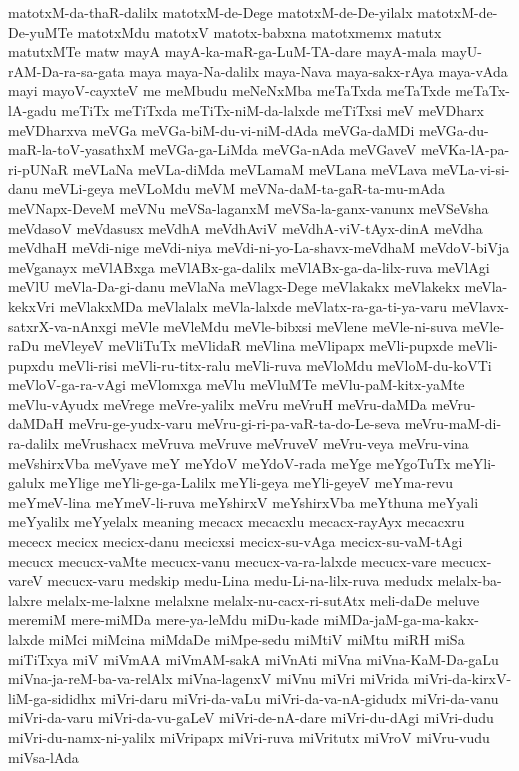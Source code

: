 {matotxM-da-thaR-dalilx
matotxM-de-Dege
matotxM-de-De-yilalx
matotxM-de-De-yuMTe
matotxMdu
matotxV
matotx-babxna
matotxmemx
matutx
matutxMTe
matw
mayA
mayA-ka-maR-ga-LuM-TA-dare
mayA-mala
mayU-rAM-Da-ra-sa-gata
maya
maya-Na-dalilx
maya-Nava
maya-sakx-rAya
maya-vAda
mayi
mayoV-cayxteV
me
meMbudu
meNeNxMba
meTaTxda
meTaTxde
meTaTx-lA-gadu
meTiTx
meTiTxda
meTiTx-niM-da-lalxde
meTiTxsi
meV
meVDharx
meVDharxva
meVGa
meVGa-biM-du-vi-niM-dAda
meVGa-daMDi
meVGa-du-maR-la-toV-yasathxM
meVGa-ga-LiMda
meVGa-nAda
meVGaveV
meVKa-lA-pa-ri-pUNaR
meVLaNa
meVLa-diMda
meVLamaM
meVLana
meVLava
meVLa-vi-si-danu
meVLi-geya
meVLoMdu
meVM
meVNa-daM-ta-gaR-ta-mu-mAda
meVNapx-DeveM
meVNu
meVSa-laganxM
meVSa-la-ganx-vanunx
meVSeVsha
meVdasoV
meVdasusx
meVdhA
meVdhAviV
meVdhA-viV-tAyx-dinA
meVdha
meVdhaH
meVdi-nige
meVdi-niya
meVdi-ni-yo-La-shavx-meVdhaM
meVdoV-biVja
meVganayx
meVlABxga
meVlABx-ga-dalilx
meVlABx-ga-da-lilx-ruva
meVlAgi
meVlU
meVla-Da-gi-danu
meVlaNa
meVlagx-Dege
meVlakakx
meVlakekx
meVla-kekxVri
meVlakxMDa
meVlalalx
meVla-lalxde
meVlatx-ra-ga-ti-ya-varu
meVlavx-satxrX-va-nAnxgi
meVle
meVleMdu
meVle-bibxsi
meVlene
meVle-ni-suva
meVle-raDu
meVleyeV
meVliTuTx
meVlidaR
meVlina
meVlipapx
meVli-pupxde
meVli-pupxdu
meVli-risi
meVli-ru-titx-ralu
meVli-ruva
meVloMdu
meVloM-du-koVTi
meVloV-ga-ra-vAgi
meVlomxga
meVlu
meVluMTe
meVlu-paM-kitx-yaMte
meVlu-vAyudx
meVrege
meVre-yalilx
meVru
meVruH
meVru-daMDa
meVru-daMDaH
meVru-ge-yudx-varu
meVru-gi-ri-pa-vaR-ta-do-Le-seva
meVru-maM-di-ra-dalilx
meVrushacx
meVruva
meVruve
meVruveV
meVru-veya
meVru-vina
meVshirxVba
meVyave
meY
meYdoV
meYdoV-rada
meYge
meYgoTuTx
meYli-galulx
meYlige
meYli-ge-ga-Lalilx
meYli-geya
meYli-geyeV
meYma-revu
meYmeV-lina
meYmeV-li-ruva
meYshirxV
meYshirxVba
meYthuna
meYyali
meYyalilx
meYyelalx
meaning
mecacx
mecacxlu
mecacx-rayAyx
mecacxru
mececx
mecicx
mecicx-danu
mecicxsi
mecicx-su-vAga
mecicx-su-vaM-tAgi
mecucx
mecucx-vaMte
mecucx-vanu
mecucx-va-ra-lalxde
mecucx-vare
mecucx-vareV
mecucx-varu
medskip
medu-Lina
medu-Li-na-lilx-ruva
medudx
melalx-ba-lalxre
melalx-me-lalxne
melalxne
melalx-nu-cacx-ri-sutAtx
meli-daDe
meluve
meremiM
mere-miMDa
mere-ya-leMdu
miDu-kade
miMDa-jaM-ga-ma-kakx-lalxde
miMci
miMcina
miMdaDe
miMpe-sedu
miMtiV
miMtu
miRH
miSa
miTiTxya
miV
miVmAA
miVmAM-sakA
miVnAti
miVna
miVna-KaM-Da-gaLu
miVna-ja-reM-ba-va-relAlx
miVna-lagenxV
miVnu
miVri
miVrida
miVri-da-kirxV-liM-ga-sididhx
miVri-daru
miVri-da-vaLu
miVri-da-va-nA-gidudx
miVri-da-vanu
miVri-da-varu
miVri-da-vu-gaLeV
miVri-de-nA-dare
miVri-du-dAgi
miVri-dudu
miVri-du-namx-ni-yalilx
miVripapx
miVri-ruva
miVritutx
miVroV
miVru-vudu
miVsa-lAda
}
